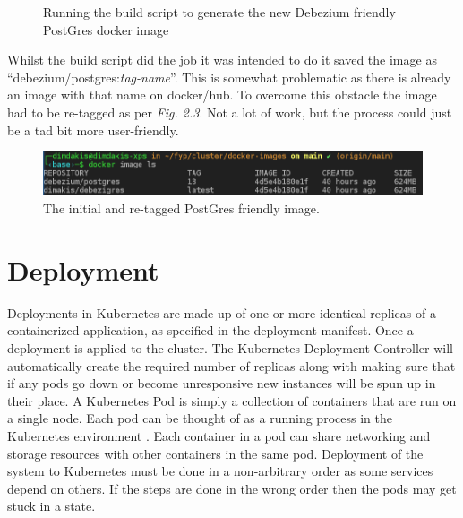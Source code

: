 \begin{flushleft}
\begin{figure} [ht]
\begin{center}
            \caption{Running the build script to generate the new Debezium friendly PostGres docker image}
            \label{fig: 2.2}
        \end{center}
    \end{figure}
    \bigbreak
    Whilst the build script did the job it was intended to do it saved the image as ``debezium/postgres:\emph{tag-name}''. This is somewhat
    problematic as there is already an image with that name on docker/hub. To overcome this obstacle the image had to be re-tagged as per \emph{Fig. 2.3}. Not a lot of work, but the
    process could just be a tad bit more user-friendly.
    \begin{figure} [ht]
        \begin{center}
            \includegraphics[width=1\textwidth]{figures/debezigres-tag.png}
            \caption{The initial and re-tagged PostGres friendly image.}
            \label{fig: 2.3}
        \end{center}
    \end{figure}

    \section{Deployment}
    Deployments in Kubernetes are made up of one or more identical replicas of a containerized application, as specified in the deployment manifest. Once a deployment is
    applied to the cluster. The Kubernetes Deployment Controller will automatically create the required number of replicas along with making sure that if any pods go down or
    become unresponsive new instances will be spun up in their place.\newline
    A Kubernetes Pod is simply a collection of containers that are run on a single node. Each pod can be thought of as a running process in the Kubernetes environment \autocite{PodKubernetesEngine}.
    Each container in a pod can share networking and storage resources with other containers in the same pod.
    \bigbreak
    Deployment of the system to Kubernetes must be done in a non-arbitrary order as some services depend on others. If the steps are done in the wrong order then the pods
    may get stuck in a  state.

\end{flushleft}
